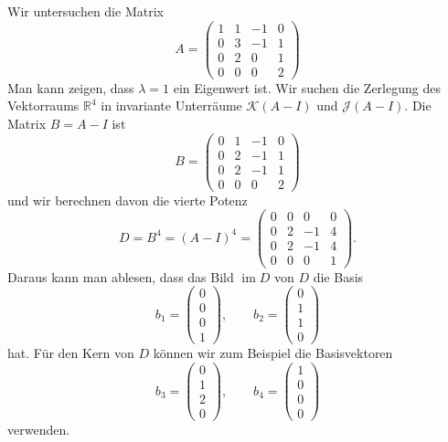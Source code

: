 \begin{beispiel}
Wir untersuchen die Matrix
\[
A
=
\begin{pmatrix}
1&1&-1&0\\
0&3&-1&1\\
0&2& 0&1\\
0&0& 0&2
\end{pmatrix}
\]
Man kann zeigen, dass $\lambda=1$ ein Eigenwert ist.
Wir suchen die Zerlegung des Vektorraums $\mathbb{R}^4$ in invariante
Unterräume $\mathcal{K}(A-I)$ und $\mathcal{J}(A-I)$.
Die Matrix $B=A-I$ ist
\[
B
=
\begin{pmatrix}
0&1&-1&0\\
0&2&-1&1\\
0&2&-1&1\\
0&0& 0&2
\end{pmatrix}
\]
und wir berechnen davon die vierte Potenz
\[
D=B^4=(A-I)^4
=
\begin{pmatrix}
0&0& 0&0\\
0&2&-1&4\\
0&2&-1&4\\
0&0& 0&1
\end{pmatrix}.
\]
Daraus kann man ablesen, dass das Bild $\operatorname{im}D$
von $D$ die Basis
\[
b_1
=
\begin{pmatrix}
0\\0\\0\\1
\end{pmatrix}
, \qquad
b_2
=
\begin{pmatrix}
0\\1\\1\\0
\end{pmatrix}
\]
hat.
Für den Kern von $D$ können wir zum Beispiel die Basisvektoren
\[
b_3
=
\begin{pmatrix}
0\\1\\2\\0
\end{pmatrix}
,\qquad
b_4
=
\begin{pmatrix}
1\\0\\0\\0
\end{pmatrix}
\]
verwenden.


\end{beispiel}
